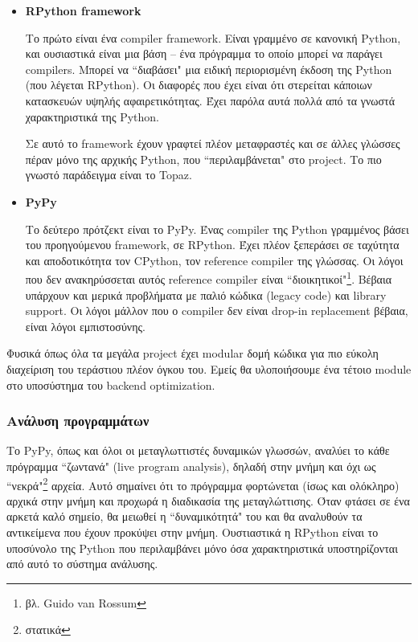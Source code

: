 \begin{itemize}

\item \textbf{RPython framework}

Το πρώτο είναι ένα compiler framework. Είναι γραμμένο σε κανονική Python, και
ουσιαστικά είναι μια βάση – ένα πρόγραμμα το οποίο μπορεί να παράγει compilers.
Μπορεί να ``διαβάσει" μια ειδική περιορισμένη έκδοση της Python (που λέγεται
RPython). Οι διαφορές που έχει είναι ότι στερείται κάποιων κατασκευών υψηλής
αφαιρετικότητας. Έχει παρόλα αυτά πολλά από τα γνωστά χαρακτηριστικά της Python.

Σε αυτό το framework έχουν γραφτεί πλέον μεταφραστές και σε άλλες γλώσσες πέραν
μόνο της αρχικής Python, που ``περιλαμβάνεται" στο project. Το πιο γνωστό
παράδειγμα είναι το Topaz\cite{topaz}.


\item \textbf{PyPy}

Το δεύτερο πρότζεκτ είναι το PyPy. Ένας compiler της Python γραμμένος βάσει του
προηγούμενου framework, σε RPython. Έχει πλέον ξεπεράσει σε ταχύτητα και
αποδοτικότητα τον CPython, τον reference compiler της γλώσσας. Οι λόγοι που δεν
ανακηρύσσεται αυτός reference compiler είναι ``διοικητικοί"\footnote{βλ. Guido
van Rossum}. Βέβαια υπάρχουν και μερικά προβλήματα με παλιό κώδικα (legacy code)
και library support. Οι λόγοι μάλλον που ο compiler δεν είναι drop-in
replacement βέβαια, είναι λόγοι εμπιστοσύνης.

\end{itemize}

Φυσικά όπως όλα τα μεγάλα project έχει modular δομή κώδικα για πιο εύκολη
διαχείριση του τεράστιου πλέον όγκου του. Εμείς θα υλοποιήσουμε ένα τέτοιο
module στο υποσύστημα του backend optimization.

\subsubsection{Ανάλυση προγραμμάτων}

Το PyPy, όπως και όλοι οι μεταγλωττιστές δυναμικών γλωσσών, αναλύει το κάθε
πρόγραμμα ``ζωντανά" (live program analysis), δηλαδή στην μνήμη και όχι ως
``νεκρά"\footnote{στατικά} αρχεία. Αυτό σημαίνει ότι το πρόγραμμα φορτώνεται
(ίσως και ολόκληρο) αρχικά στην μνήμη και προχωρά η διαδικασία της
μεταγλώττισης. Όταν φτάσει σε ένα αρκετά καλό σημείο, θα μειωθεί η
``δυναμικότητά" του και θα αναλυθούν τα αντικείμενα που έχουν προκύψει στην
μνήμη. Ουστιαστικά η RPython είναι το υποσύνολο της Python που περιλαμβάνει μόνο
όσα χαρακτηριστικά υποστηρίζονται από αυτό το σύστημα ανάλυσης.

